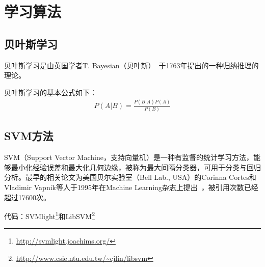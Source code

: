 \documentclass[12pt]{article}
\begin{document}
\section{学习算法}

\subsection{贝叶斯学习}

贝叶斯学习是由英国学者T. Bayesian（贝叶斯）~\cite{mr1763essay}于1763年提出的一种归纳推理的理论。

贝叶斯学习的基本公式如下：
\begin{align}
P(A|B) = \frac{P(B|A)P(A)}{P(B)}
\end{align}

\subsection{SVM方法}

SVM（Support Vector Machine，支持向量机）是一种有监督的统计学习方法，能够最小化经验误差和最大化几何边缘，被称为最大间隔分类器，可用于分类与回归分析。最早的相关论文为美国贝尔实验室（Bell Lab., USA）的Corinna Cortes和Vladimir Vapnik等人于1995年在Machine Learning杂志上提出~\cite{cortes1995support}，被引用次数已经超过17600次。

{\color{blue}代码}：SVMlight\footnote{\url{http://svmlight.joachims.org/}}和LibSVM\footnote{\url{http://www.csie.ntu.edu.tw/~cjlin/libsvm}}
\end{document}
